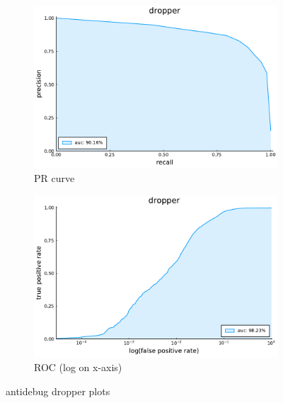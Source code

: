 \begin{figure}
    \centering
    \begin{subfigure}{.49\textwidth}
      \centering
      \includegraphics[width=1\linewidth]{pdfs/modperf/dropper.bson-pr.pdf}
      \caption{PR curve}
    \end{subfigure}
    \begin{subfigure}{.49\textwidth}
        \centering
        \includegraphics[width=1\linewidth]{pdfs/modperf/dropper.bson-roclog.pdf}
        \caption{ROC (log on x-axis)}
    \end{subfigure}
    \caption{antidebug dropper plots}
    \label{fig:fig}
\end{figure}


